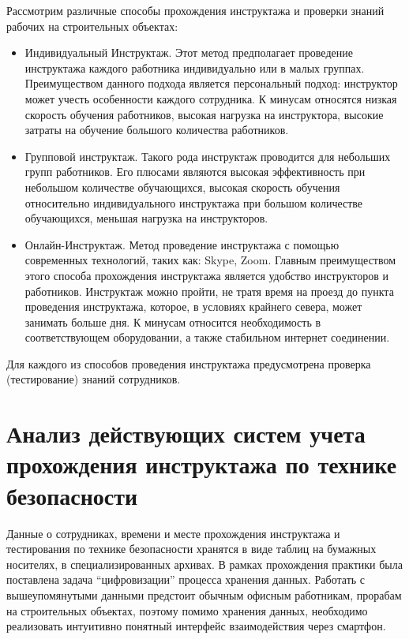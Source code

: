 Рассмотрим различные способы прохождения инструктажа и проверки знаний рабочих на строительных объектах:  
\begin{itemize}
\item Индивидуальный Инструктаж. Этот метод предполагает проведение инструктажа каждого работника индивидуально или в малых группах. Преимуществом данного подхода является персональный подход: инструктор может учесть особенности каждого сотрудника. К минусам относятся низкая скорость обучения работников, высокая нагрузка на инструктора, высокие затраты на обучение большого количества работников.

\item Групповой инструктаж. Такого рода инструктаж проводится для небольших групп работников. Его плюсами являются высокая эффективность при небольшом количестве обучающихся, высокая скорость обучения относительно индивидуального инструктажа при большом количестве обучающихся, меньшая нагрузка на инструкторов.  

\item Онлайн-Инструктаж. Метод проведение инструктажа с помощью современных технологий, таких как: Skype, Zoom. Главным преимуществом этого способа прохождения инструктажа является удобство инструкторов и работников. Инструктаж можно пройти, не тратя время на проезд до пункта проведения инструктажа, которое, в условиях крайнего севера, может занимать больше дня. К минусам относится необходимость в соответствующем оборудовании, а также стабильном интернет соединении.  
\end{itemize}

Для каждого из способов проведения инструктажа предусмотрена проверка (тестирование) знаний сотрудников.   


\section{Анализ действующих систем учета прохождения инструктажа по технике безопасности}

Данные о сотрудниках, времени и месте прохождения инструктажа и тестирования по технике безопасности хранятся в виде таблиц на бумажных носителях, в специализированных архивах. В рамках прохождения практики была поставлена задача “цифровизации” процесса хранения данных. Работать с вышеупомянутыми данными предстоит обычным офисным работникам, прорабам на строительных объектах, поэтому помимо хранения данных, необходимо реализовать интуитивно понятный интерфейс взаимодействия через смартфон.


